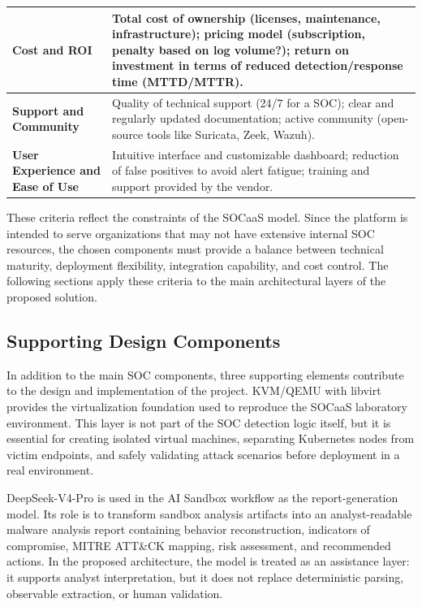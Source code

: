\begin{table}[H]
\begin{tabular}{>{\raggedright\arraybackslash}p{3cm} p{10.5cm}}
\midrule
\textbf{Cost and ROI} & Total cost of ownership (licenses, maintenance, infrastructure); pricing model (subscription, penalty based on log volume?); return on investment in terms of reduced detection/response time (MTTD/MTTR). \\
\midrule
\textbf{Support and Community} & Quality of technical support (24/7 for a SOC); clear and regularly updated documentation; active community (open-source tools like Suricata, Zeek, Wazuh). \\
\midrule
\textbf{User Experience and Ease of Use} & Intuitive interface and customizable dashboard; reduction of false positives to avoid alert fatigue; training and support provided by the vendor. \\
\bottomrule
\end{tabular}
\end{table}

These criteria reflect the constraints of the SOCaaS model. Since the platform is intended to serve organizations that may not have extensive internal SOC resources, the chosen components must provide a balance between technical maturity, deployment flexibility, integration capability, and cost control. The following sections apply these criteria to the main architectural layers of the proposed solution.

\subsection{Supporting Design Components}
\label{subsec:supporting-design-components}

In addition to the main SOC components, three supporting elements contribute to the design and implementation of the project. KVM/QEMU with libvirt provides the virtualization foundation used to reproduce the SOCaaS laboratory environment. This layer is not part of the SOC detection logic itself, but it is essential for creating isolated virtual machines, separating Kubernetes nodes from victim endpoints, and safely validating attack scenarios before deployment in a real environment.

DeepSeek-V4-Pro is used in the AI Sandbox workflow as the report-generation model. Its role is to transform sandbox analysis artifacts into an analyst-readable malware analysis report containing behavior reconstruction, indicators of compromise, MITRE ATT\&CK mapping, risk assessment, and recommended actions. In the proposed architecture, the model is treated as an assistance layer: it supports analyst interpretation, but it does not replace deterministic parsing, observable extraction, or human validation.

